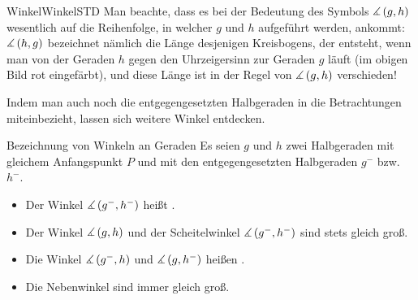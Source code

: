 \begin{MXContent}{Winkel}{Winkel}{STD}
Man beachte, dass es bei der Bedeutung des Symbols $\measuredangle \left( g, h \right)$ wesentlich auf die Reihenfolge, in welcher $g$ und $h$ aufgef\"uhrt werden, ankommt:
$\measuredangle \left( h, g \right)$ bezeichnet n\"amlich die L\"ange desjenigen Kreisbogens, der entsteht, wenn man von der Geraden $h$ gegen den Uhrzeigersinn zur Geraden $g$ l\"auft (im obigen Bild rot eingef\"arbt), und diese L\"ange ist in der Regel von $\measuredangle \left( g, h \right)$ verschieden!


%

Indem man auch noch die entgegengesetzten Halbgeraden in die Betrachtungen miteinbezieht, lassen sich weitere Winkel entdecken.

\begin{MXInfo}{Bezeichnung von Winkeln an Geraden}%
%
Es seien $g$ und $h$ zwei Halbgeraden mit gleichem Anfangspunkt $P$ und mit den entgegengesetzten Halbgeraden $g^-$ bzw. $h^-$.
  \begin{itemize}
    \item Der Winkel $\measuredangle \left( g^-, h^- \right)$ hei\ss t .
		\item Der Winkel $\measuredangle \left( g, h \right)$ und der Scheitelwinkel $\measuredangle \left( g^-, h^- \right)$ sind stets gleich gro\ss.
\item Die Winkel $\measuredangle \left( g^-, h \right)$ und $\measuredangle \left( g, h^- \right)$ hei\ss en .
\item Die Nebenwinkel sind immer gleich gro\ss.
  \end{itemize}
\end{MXInfo}





\end{MXContent}
